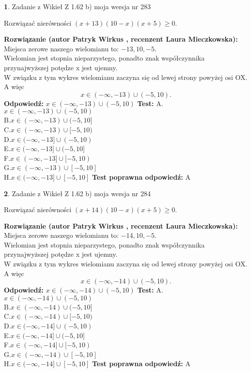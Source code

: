 \documentclass[12pt, a4paper]{article}
\theoremstyle{definition} %
\newtheorem{zad}{}
\newcommand{\zadStart}[1]{\begin{zad}#1\newline}
\newcommand{\zadStop}{\end{zad}}
\newcommand{\rozwStart}[2]{\noindent \textbf{Rozwiązanie (autor #1 , recenzent #2): }\newline}
\newcommand{\rozwStop}{\newline}
\newcommand{\odpStart}{\noindent \textbf{Odpowiedź:}\newline}
\newcommand{\odpStop}{\newline}
\newcommand{\testStart}{\noindent \textbf{Test:}\newline}
\newcommand{\testStop}{\newline}
\newcommand{\kluczStart}{\noindent \textbf{Test poprawna odpowiedź:}\newline}
\newcommand{\kluczStop}{\newline}
\begin{document}
\zadStart{Zadanie z Wikieł Z 1.62 b) moja wersja nr 283}

Rozwiązać nierówności $(x+13)(10-x)(x+5)\ge0$.
\zadStop
\rozwStart{Patryk Wirkus}{Laura Mieczkowska}
Miejsca zerowe naszego wielomianu to: $-13, 10, -5$.\\
Wielomian jest stopnia nieparzystego, ponadto znak współczynnika przy\linebreak najwyższej potędze x jest ujemny.\\ W związku z tym wykres wielomianu zaczyna się od lewej strony powyżej osi OX. A więc $$x \in (-\infty,-13) \cup (-5,10).$$
\rozwStop
\odpStart
$x \in (-\infty,-13) \cup (-5,10)$
\odpStop
\testStart
A.$x \in (-\infty,-13) \cup (-5,10)$\\
B.$x \in (-\infty,-13) \cup (-5,10]$\\
C.$x \in (-\infty,-13) \cup [-5,10)$\\
D.$x \in (-\infty,-13] \cup (-5,10)$\\
E.$x \in (-\infty,-13] \cup (-5,10]$\\
F.$x \in (-\infty,-13] \cup [-5,10)$\\
G.$x \in (-\infty,-13) \cup [-5,10]$\\
H.$x \in (-\infty,-13] \cup [-5,10]$
\testStop
\kluczStart
A
\kluczStop



\zadStart{Zadanie z Wikieł Z 1.62 b) moja wersja nr 284}

Rozwiązać nierówności $(x+14)(10-x)(x+5)\ge0$.
\zadStop
\rozwStart{Patryk Wirkus}{Laura Mieczkowska}
Miejsca zerowe naszego wielomianu to: $-14, 10, -5$.\\
Wielomian jest stopnia nieparzystego, ponadto znak współczynnika przy\linebreak najwyższej potędze x jest ujemny.\\ W związku z tym wykres wielomianu zaczyna się od lewej strony powyżej osi OX. A więc $$x \in (-\infty,-14) \cup (-5,10).$$
\rozwStop
\odpStart
$x \in (-\infty,-14) \cup (-5,10)$
\odpStop
\testStart
A.$x \in (-\infty,-14) \cup (-5,10)$\\
B.$x \in (-\infty,-14) \cup (-5,10]$\\
C.$x \in (-\infty,-14) \cup [-5,10)$\\
D.$x \in (-\infty,-14] \cup (-5,10)$\\
E.$x \in (-\infty,-14] \cup (-5,10]$\\
F.$x \in (-\infty,-14] \cup [-5,10)$\\
G.$x \in (-\infty,-14) \cup [-5,10]$\\
H.$x \in (-\infty,-14] \cup [-5,10]$
\testStop
\kluczStart
A
\kluczStop
\end{document}
